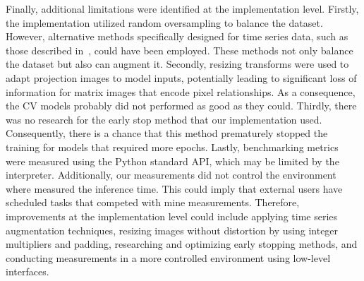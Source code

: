 Finally, additional limitations were identified at the implementation level.  Firstly, the implementation utilized random oversampling to balance the dataset. However, alternative methods specifically designed for time series data, such as those described in~\cite{TimeSeriesAugmentation}, could have been employed.  These methods not only balance the dataset but also can augment it. Secondly, resizing transforms were used to adapt projection images to model inputs, potentially leading to significant loss of information for matrix images that encode pixel relationships. As a consequence, the \gls{CV} models probably did not performed as good as they could. Thirdly, there was no research for the early stop method that our implementation used. Consequently, there is a chance that this method prematurely stopped the training for models that required more epochs.  Lastly, benchmarking metrics were measured using the Python standard API, which may be limited by the interpreter. Additionally, our measurements did not control the environment where measured the inference time. This could imply that external users have scheduled tasks that competed with mine measurements. Therefore, improvements at the implementation level could include applying time series augmentation techniques, resizing images without distortion by using integer multipliers and padding, researching and optimizing early stopping methods, and conducting measurements in a more controlled environment using low-level interfaces.


